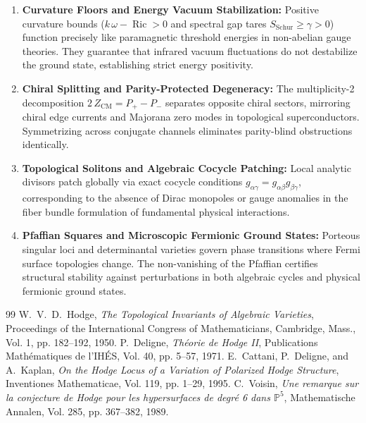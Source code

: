 \documentclass[11pt,a4paper]{article}
\theoremstyle{definition}
\begin{document}
\begin{enumerate}
  \item \textbf{Curvature Floors and Energy Vacuum Stabilization:} 
  Positive curvature bounds ($k\,\omega - \operatorname{Ric} > 0$ and spectral gap tares $S_{\mathrm{Schur}} \ge \gamma > 0$) function precisely like paramagnetic threshold energies in non-abelian gauge theories. They guarantee that infrared vacuum fluctuations do not destabilize the ground state, establishing strict energy positivity.
  
  \item \textbf{Chiral Splitting and Parity-Protected Degeneracy:} 
  The multiplicity-2 decomposition $2\,Z_{\mathrm{CM}} = P_+ - P_-$ separates opposite chiral sectors, mirroring chiral edge currents and Majorana zero modes in topological superconductors. Symmetrizing across conjugate channels eliminates parity-blind obstructions identically.
  
  \item \textbf{Topological Solitons and Algebraic Cocycle Patching:} 
  Local analytic divisors patch globally via exact cocycle conditions $g_{\alpha\gamma} = g_{\alpha\beta} g_{\beta\gamma}$, corresponding to the absence of Dirac monopoles or gauge anomalies in the fiber bundle formulation of fundamental physical interactions.
  
  \item \textbf{Pfaffian Squares and Microscopic Fermionic Ground States:} 
  Porteous singular loci and determinantal varieties govern phase transitions where Fermi surface topologies change. The non-vanishing of the Pfaffian certifies structural stability against perturbations in both algebraic cycles and physical fermionic ground states.
\end{enumerate}

\begin{thebibliography}{99}
 W.~V.~D.~Hodge, \emph{The Topological Invariants of Algebraic Varieties}, Proceedings of the International Congress of Mathematicians, Cambridge, Mass., Vol. 1, pp. 182--192, 1950.
 P.~Deligne, \emph{Th\'eorie de Hodge II}, Publications Math\'ematiques de l'IH\'ES, Vol. 40, pp. 5--57, 1971.
 E.~Cattani, P.~Deligne, and A.~Kaplan, \emph{On the Hodge Locus of a Variation of Polarized Hodge Structure}, Inventiones Mathematicae, Vol. 119, pp. 1--29, 1995.
 C.~Voisin, \emph{Une remarque sur la conjecture de Hodge pour les hypersurfaces de degr\'e 6 dans $\mathbb{P}^5$}, Mathematische Annalen, Vol. 285, pp. 367--382, 1989.
\end{thebibliography}
\end{document}
